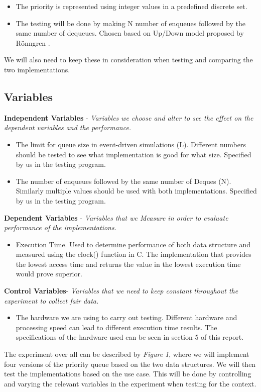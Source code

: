 \documentclass[12pt]{article}
\begin{document}
\begin{itemize}
   \item The priority is represented using integer values in a predefined discrete set. 
   \item The testing will be done by making N number of enqueues followed by the same number of dequeues. Chosen based on Up/Down model proposed by Rönngren  \cite{robert}. 
\end{itemize}

We will also need to keep these in consideration when testing and comparing the two implementations.

\subsection{Variables} 
\textbf{Independent Variables}  - \textit{Variables we choose and alter to see the effect on the dependent variables and the performance.}
\begin{itemize}
 \item The limit for queue size in event-driven simulations (L). Different numbers should be tested to see what implementation is good for what size. Specified by us in the testing program.
\item The number of enqueues followed by the same number of Deques (N). Similarly multiple values should be used with both implementations. Specified by us in the testing program.
\end{itemize}
\textbf{Dependent Variables} - \textit{Variables that we Measure in order to evaluate performance of the implementations.}
\begin{itemize}
\item Execution Time. Used to determine performance of both data structure and measured using the clock() function in C. The implementation that provides the lowest access time and returns the value in the lowest execution time would prove superior.
\end{itemize}
\textbf{Control Variables}- \textit{Variables that we need to keep constant throughout the experiment to collect fair data.}
\begin{itemize}
\item The hardware we are using to carry out testing. Different hardware and processing speed can lead to different execution time results. The specifications of the hardware used can be seen in section 5 of this report. 
\end{itemize}
The experiment over all can be described by \textit{Figure 1}, where we will implement four versions of the priority queue based on the two data structures. We will then test the implementations based on the use case. This will be done by controlling and varying the relevant variables in the experiment when testing for the context. 
\end{document}
